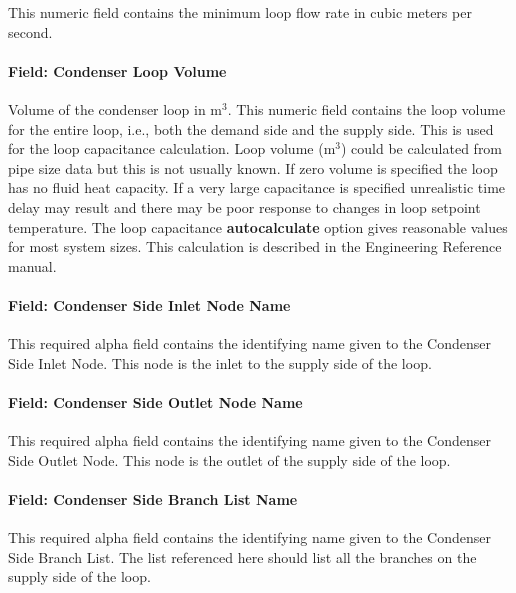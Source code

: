 This numeric field contains the minimum loop flow rate in cubic meters per second.

\paragraph{Field: Condenser Loop Volume}\label{field-condenser-loop-volume}

Volume of the condenser loop in m\(^{3}\). This numeric field contains the loop volume for the entire loop, i.e., both the demand side and the supply side. This is used for the loop capacitance calculation. Loop volume (m\(^{3}\)) could be calculated from pipe size data but this is not usually known. If zero volume is specified the loop has no fluid heat capacity. If a very large capacitance is specified unrealistic time delay may result and there may be poor response to changes in loop setpoint temperature. The loop capacitance \textbf{autocalculate} option gives reasonable values for most system sizes. This calculation is described in the Engineering Reference manual.

\paragraph{Field: Condenser Side Inlet Node Name}\label{field-condenser-side-inlet-node-name}

This required alpha field contains the identifying name given to the Condenser Side Inlet Node. This node is the inlet to the supply side of the loop.

\paragraph{Field: Condenser Side Outlet Node Name}\label{field-condenser-side-outlet-node-name}

This required alpha field contains the identifying name given to the Condenser Side Outlet Node. This node is the outlet of the supply side of the loop.

\paragraph{Field: Condenser Side Branch List Name}\label{field-condenser-side-branch-list-name}

This required alpha field contains the identifying name given to the Condenser Side Branch List. The list referenced here should list all the branches on the supply side of the loop.

